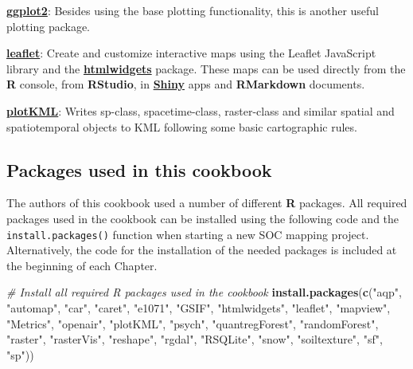 \documentclass[10pt,b5paper,]{book}
\newenvironment{Shaded}{\begin{snugshade}}{\end{snugshade}}
\newcommand{\CommentTok}[1]{\textcolor[rgb]{0.56,0.35,0.01}{\textit{#1}}}
\newcommand{\KeywordTok}[1]{\textcolor[rgb]{0.13,0.29,0.53}{\textbf{#1}}}
\newcommand{\NormalTok}[1]{#1}
\newcommand{\StringTok}[1]{\textcolor[rgb]{0.31,0.60,0.02}{#1}}
\theoremstyle{definition}
\theoremstyle{definition}
\theoremstyle{definition}
\theoremstyle{remark}
\begin{document}
\href{https://cran.r-project.org/web/packages/ggplot2/index.html}{\textbf{ggplot2}}:
Besides using the base plotting functionality, this is another useful
plotting package.

\href{https://CRAN.R-project.org/package=leaflet}{\textbf{leaflet}}:
Create and customize interactive maps using the Leaflet JavaScript
library and the
\href{https://cran.r-project.org/web/packages/htmlwidgets/index.html}{\textbf{htmlwidgets}}
package. These maps can be used directly from the \textbf{R} console,
from \textbf{RStudio}, in
\href{https://shiny.rstudio.com/}{\textbf{Shiny}} apps and
\textbf{RMarkdown} documents.

\href{https://CRAN.R-project.org/package=plotKML}{\textbf{plotKML}}:
Writes sp-class, spacetime-class, raster-class and similar spatial and
spatiotemporal objects to KML following some basic cartographic rules.

\hypertarget{packages-used-in-this-cookbook}{%
\subsection{Packages used in this
cookbook}\label{packages-used-in-this-cookbook}}

The authors of this cookbook used a number of different \textbf{R}
packages. All required packages used in the cookbook can be installed
using the following code and the \texttt{install.packages()} function
when starting a new SOC mapping project. Alternatively, the code for the
installation of the needed packages is included at the beginning of each
Chapter.

\begin{Shaded}
\begin{Highlighting}[]
\CommentTok{# Install all required R packages used in the cookbook}
\KeywordTok{install.packages}\NormalTok{(}\KeywordTok{c}\NormalTok{(}\StringTok{"aqp"}\NormalTok{, }\StringTok{"automap"}\NormalTok{, }\StringTok{"car"}\NormalTok{, }\StringTok{"caret"}\NormalTok{, }\StringTok{"e1071"}\NormalTok{,}
                   \StringTok{"GSIF"}\NormalTok{, }\StringTok{"htmlwidgets"}\NormalTok{, }\StringTok{"leaflet"}\NormalTok{, }\StringTok{"mapview"}\NormalTok{,}
                   \StringTok{"Metrics"}\NormalTok{, }\StringTok{"openair"}\NormalTok{, }\StringTok{"plotKML"}\NormalTok{, }\StringTok{"psych"}\NormalTok{, }
                   \StringTok{"quantregForest"}\NormalTok{, }\StringTok{"randomForest"}\NormalTok{, }\StringTok{"raster"}\NormalTok{,}
                   \StringTok{"rasterVis"}\NormalTok{, }\StringTok{"reshape"}\NormalTok{, }\StringTok{"rgdal"}\NormalTok{, }\StringTok{"RSQLite"}\NormalTok{,}
                   \StringTok{"snow"}\NormalTok{, }\StringTok{"soiltexture"}\NormalTok{, }\StringTok{"sf"}\NormalTok{, }\StringTok{"sp"}\NormalTok{))}
\end{Highlighting}
\end{Shaded}
\end{document}
